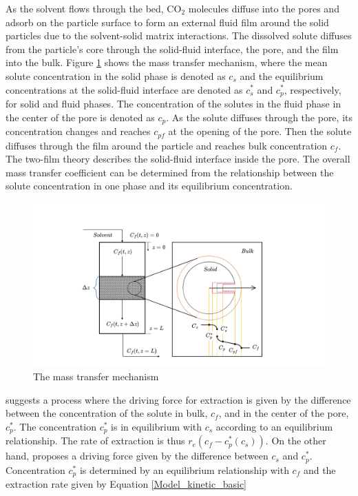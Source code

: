 \documentclass[../Article_Model_Parameters.tex]{subfiles}
\begin{document}
			As the solvent flows through the bed, CO$_2$ molecules diffuse into the pores and adsorb on the particle surface to form an external fluid film around the solid particles due to the solvent-solid matrix interactions. The dissolved solute diffuses from the particle's core through the solid-fluid interface, the pore, and the film into the bulk. Figure \ref{fig: SFE_Mechanism} shows the mass transfer mechanism, where the mean solute concentration in the solid phase is denoted as $c_s$ and the equilibrium concentrations at the solid-fluid interface are denoted as $c_s^*$ and $c_p^*$, respectively, for solid and fluid phases. The concentration of the solutes in the fluid phase in the center of the pore is denoted as $c_p$. As the solute diffuses through the pore, its concentration changes and reaches $c_{pf}$ at the opening of the pore. Then the solute diffuses through the film around the particle and reaches bulk concentration $c_f$. The two-film theory describes the solid-fluid interface inside the pore. The overall mass transfer coefficient can be determined from the relationship between the solute concentration in one phase and its equilibrium concentration.
			
			\begin{figure}[h!]
				\centering
				\includegraphics[trim = 45cm 0cm 60cm 20cm,clip,width=0.85\columnwidth]{Figures/SFE_PFD.drawio.png}	
				\caption{The mass transfer mechanism}
				\label{fig: SFE_Mechanism}
			\end{figure}
			
			\citet{Bulley1984} suggests a process where the driving force for extraction is given by the difference between the concentration of the solute in bulk, $c_f$, and in the center of the pore, $c_p^*$. The concentration $c_p^*$ is in equilibrium with $c_s$ according to an equilibrium relationship. The rate of extraction is thus $r_e\left(c_f - c^*_p(c_s)\right)$. On the other hand, \citet{Reverchon1996} proposes a driving force given by the difference between $c_s$ and $c_p^*$. Concentration $c_p^*$ is determined by an equilibrium relationship with $c_f$ and the extraction rate given by Equation \ref{Model_kinetic_basic}
			
\end{document}
